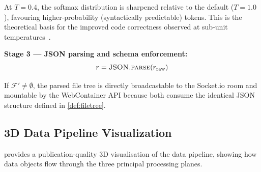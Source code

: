 At $T = 0.4$, the softmax distribution is sharpened relative to the default
($T = 1.0$), favouring higher-probability (syntactically predictable) tokens.
This is the theoretical basis for the improved code correctness observed at
sub-unit temperatures~\cite{chen2021evaluating}.

\noindent \textbf{Stage 3 --- JSON parsing and schema enforcement:}
\[
  r = \textsc{JSON.parse}(r_{\text{raw}})
\]

If $\mathcal{F}' \neq \emptyset$, the parsed file tree is directly broadcastable
to the Socket.io room and mountable by the WebContainer API because both consume
the identical JSON structure defined in \cref{def:filetree}.

\subsection{3D Data Pipeline Visualization}
\label{sub:3d_pipeline}

 provides a publication-quality 3D visualisation of the
\echoray{} data pipeline, showing how data objects flow through the three
principal processing planes.

